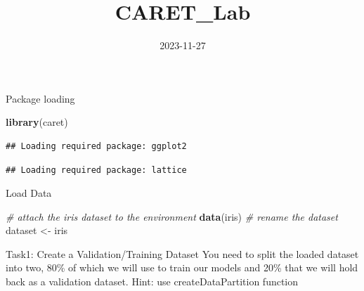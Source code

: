\documentclass[
]{article}
\title{CARET\_Lab}
\author{}
\date{\vspace{-2.5em}2023-11-27}
\newenvironment{Shaded}{\begin{snugshade}}{\end{snugshade}}
\newcommand{\AttributeTok}[1]{\textcolor[rgb]{0.13,0.29,0.53}{#1}}
\newcommand{\CommentTok}[1]{\textcolor[rgb]{0.56,0.35,0.01}{\textit{#1}}}
\newcommand{\ConstantTok}[1]{\textcolor[rgb]{0.56,0.35,0.01}{#1}}
\newcommand{\DecValTok}[1]{\textcolor[rgb]{0.00,0.00,0.81}{#1}}
\newcommand{\FloatTok}[1]{\textcolor[rgb]{0.00,0.00,0.81}{#1}}
\newcommand{\FunctionTok}[1]{\textcolor[rgb]{0.13,0.29,0.53}{\textbf{#1}}}
\newcommand{\NormalTok}[1]{#1}
\newcommand{\OtherTok}[1]{\textcolor[rgb]{0.56,0.35,0.01}{#1}}
\newcommand{\SpecialCharTok}[1]{\textcolor[rgb]{0.81,0.36,0.00}{\textbf{#1}}}
\begin{document}
\maketitle

Package loading

\begin{Shaded}
\begin{Highlighting}[]
\FunctionTok{library}\NormalTok{(caret)}
\end{Highlighting}
\end{Shaded}

\begin{verbatim}
## Loading required package: ggplot2
\end{verbatim}

\begin{verbatim}
## Loading required package: lattice
\end{verbatim}

Load Data

\begin{Shaded}
\begin{Highlighting}[]
\CommentTok{\# attach the iris dataset to the environment}
\FunctionTok{data}\NormalTok{(iris)}
\CommentTok{\# rename the dataset}
\NormalTok{dataset }\OtherTok{\textless{}{-}}\NormalTok{ iris}
\end{Highlighting}
\end{Shaded}

Task1: Create a Validation/Training Dataset You need to split the loaded
dataset into two, 80\% of which we will use to train our models and 20\%
that we will hold back as a validation dataset. Hint: use
createDataPartition function

\begin{Shaded}
\end{Shaded}
\end{document}
